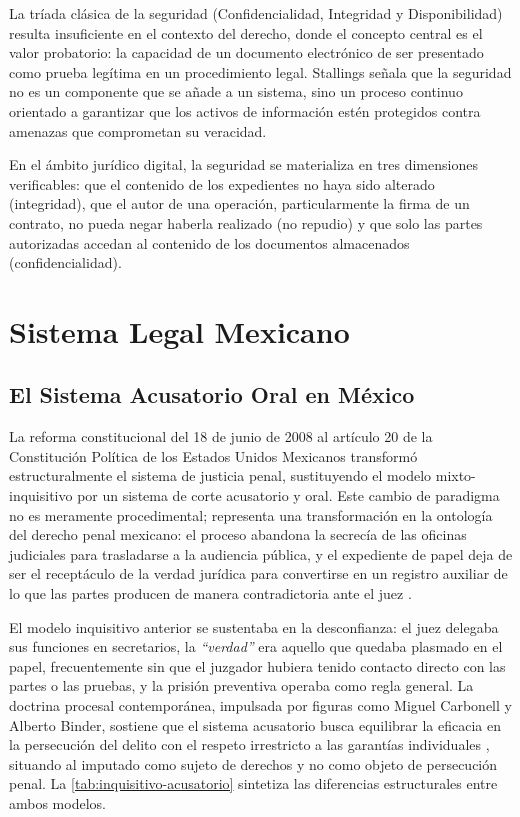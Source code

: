 La tríada clásica de la seguridad (Confidencialidad, Integridad y Disponibilidad) \cite{stallings2017} resulta insuficiente en el contexto del derecho, donde el concepto central es el valor probatorio: la capacidad de un documento electrónico de ser presentado como prueba legítima en un procedimiento legal. Stallings \cite{stallings2017} señala que la seguridad no es un componente que se añade a un sistema, sino un proceso continuo orientado a garantizar que los activos de información estén protegidos contra amenazas que comprometan su veracidad.

En el ámbito jurídico digital, la seguridad se materializa en tres dimensiones verificables: que el contenido de los expedientes no haya sido alterado (integridad), que el autor de una operación, particularmente la firma de un contrato, no pueda negar haberla realizado (no repudio) y que solo las partes autorizadas accedan al contenido de los documentos almacenados (confidencialidad).

\section{Sistema Legal Mexicano}\label{sec:sistema-legal}

\subsection{El Sistema Acusatorio Oral en México}\label{sec:acusatorio-oral}

La reforma constitucional del 18 de junio de 2008 al artículo 20 de la Constitución Política de los Estados Unidos Mexicanos transformó estructuralmente el sistema de justicia penal, sustituyendo el modelo mixto-inquisitivo por un sistema de corte acusatorio y oral. Este cambio de paradigma no es meramente procedimental; representa una transformación en la ontología del derecho penal mexicano: el proceso abandona la secrecía de las oficinas judiciales para trasladarse a la audiencia pública, y el expediente de papel deja de ser el receptáculo de la verdad jurídica para convertirse en un registro auxiliar de lo que las partes producen de manera contradictoria ante el juez \cite{cnpp2021,agepuebla2020}.

El modelo inquisitivo anterior se sustentaba en la desconfianza: el juez delegaba sus funciones en secretarios, la \emph{``verdad''} era aquello que quedaba plasmado en el papel, frecuentemente sin que el juzgador hubiera tenido contacto directo con las partes o las pruebas, y la prisión preventiva operaba como regla general. La doctrina procesal contemporánea, impulsada por figuras como Miguel Carbonell y Alberto Binder, sostiene que el sistema acusatorio busca equilibrar la eficacia en la persecución del delito con el respeto irrestricto a las garantías individuales \cite{iejcdmx2018}, situando al imputado como sujeto de derechos y no como objeto de persecución penal. La \cref{tab:inquisitivo-acusatorio} sintetiza las diferencias estructurales entre ambos modelos.

